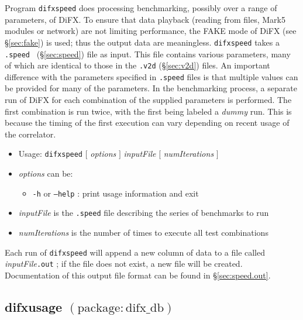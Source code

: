 Program {\tt difxspeed} does processing benchmarking, possibly over a range of parameters, of DiFX.
To ensure that data playback (reading from files, Mark5 modules or network) are not limiting performance, the FAKE mode of DiFX (see \S\ref{sec:fake}) is used; thus the output data are meaningless.
{\tt difxspeed} takes a {\tt .speed } (\S\ref{sec:speed}) file as input.
This file contains various parameters, many of which are identical to those in the {\tt .v2d} (\S\ref{sec:v2d}) files.
An important difference with the parameters specified in {\tt .speed} files is that multiple values can be provided for many of the parameters.
In the benchmarking process, a separate run of DiFX for each combination of the supplied parameters is performed.
The first combination is run twice, with the first being labeled a {\em dummy} run.
This is because the timing of the first execution can vary depending on recent usage of the correlator.

\begin{itemize}
\item[] Usage: {\tt difxspeed} $[$ {\em options} $]$ {\em inputFile} $[$ {\em numIterations} $]$
\item[] {\em options} can be:
\begin{itemize}
\item[] {\tt -h} or {\tt --help} : print usage information and exit
\end{itemize}
\item[] {\em inputFile} is the {\tt .speed} file describing the series of benchmarks to run
\item[] {\em numIterations} is the number of times to execute all test combinations
\end{itemize}

Each run of {\tt difxspeed} will append a new column of data to a file called {\em inputFile}{\tt .out} ; if the file does not exist, a new file will be created.
Documentation of this output file format can be found in \S\ref{sec:speed.out}.








\subsection{difxusage {\small $\mathrm{(package: difx\_db)}$}} \label{sec:difxusage}

